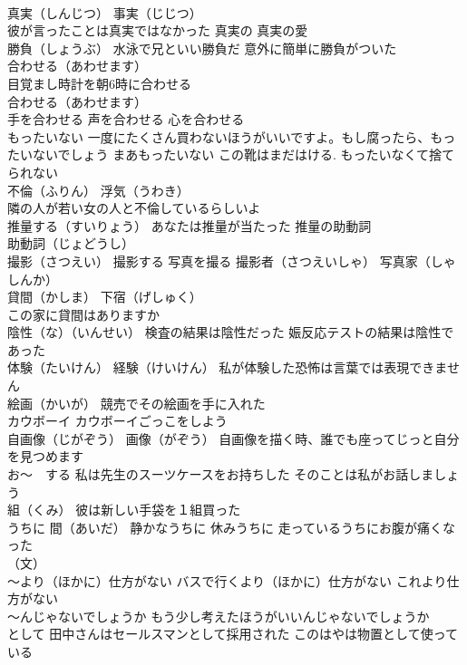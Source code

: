 \documentclass[8pt]{extreport}
\begin{document}
\begin{CJK}{UTF8}{min}
\\	真実（しんじつ） 事実（じじつ）
\\	彼が言ったことは真実ではなかった 真実の 真実の愛
\\	勝負（しょうぶ） 水泳で兄といい勝負だ 意外に簡単に勝負がついた
\\	合わせる（あわせます） 
\\	目覚まし時計を朝6時に合わせる
\\	合わせる（あわせます） 
\\	手を合わせる 声を合わせる 心を合わせる
\\	もったいない 一度にたくさん買わないほうがいいですよ。もし腐ったら、もったいないでしょう まあもったいない この靴はまだはける. もったいなくて捨てられない
\\	不倫（ふりん） 浮気（うわき）
\\	隣の人が若い女の人と不倫しているらしいよ
\\	推量する（すいりょう） あなたは推量が当たった 推量の助動詞
\\	助動詞（じょどうし）
\\	撮影（さつえい） 撮影する 写真を撮る 撮影者（さつえいしゃ） 写真家（しゃしんか）
\\	貸間（かしま） 下宿（げしゅく）
\\	この家に貸間はありますか
\\	陰性（な）（いんせい） 検査の結果は陰性だった 娠反応テストの結果は陰性であった
\\	体験（たいけん） 経験（けいけん） 私が体験した恐怖は言葉では表現できません
\\	絵画（かいが） 競売でその絵画を手に入れた
\\	カウボーイ カウボーイごっこをしよう
\\	自画像（じがぞう） 画像（がぞう） 自画像を描く時、誰でも座ってじっと自分を見つめます
\\	お～　する 私は先生のスーツケースをお持ちした そのことは私がお話しましょう
\\	組（くみ） 彼は新しい手袋を１組買った
\\	うちに 間（あいだ） 静かなうちに 休みうちに 走っているうちにお腹が痛くなった
\\	（文）
\\	～より（ほかに）仕方がない バスで行くより（ほかに）仕方がない これより仕方がない
\\	～んじゃないでしょうか もう少し考えたほうがいいんじゃないでしょうか
\\	として 田中さんはセールスマンとして採用された このはやは物置として使っている

\end{CJK}
\end{document}
